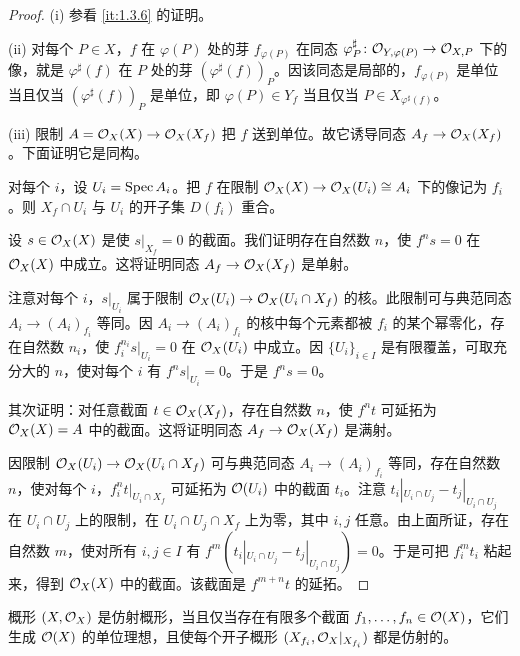\begin{proof}
(i) 参看 \ref{it:1.3.6} 的证明。

(ii) 对每个 $P\in X$，$f$ 在 $\varphi(P)$ 处的芽 $f_{\varphi(P)}$ 在同态 $\varphi^\sharp_P\colon \mathcal{O}_{Y,\varphi(P)}\to \mathcal{O}_{X,P}$ 下的像，就是 $\varphi^\sharp(f)$ 在 $P$ 处的芽 $(\varphi^\sharp(f))_P$。因该同态是局部的，$f_{\varphi(P)}$ 是单位当且仅当 $(\varphi^\sharp(f))_P$ 是单位，即 $\varphi(P)\in Y_f$ 当且仅当 $P\in X_{\varphi^\sharp(f)}$。

(iii) 限制 $A=\mathcal{O}_X(X)\to \mathcal{O}_X(X_f)$ 把 $f$ 送到单位。故它诱导同态 $A_f\to \mathcal{O}_X(X_f)$。下面证明它是同构。

对每个 $i$，设 $U_i=\operatorname{Spec} A_i$。把 $f$ 在限制 $\mathcal{O}_X(X)\to \mathcal{O}_X(U_i)\cong A_i$ 下的像记为 $f_i$。则 $X_f\cap U_i$ 与 $U_i$ 的开子集 $D(f_i)$ 重合。

设 $s\in \mathcal{O}_X(X)$ 是使 $s|_{X_f}=0$ 的截面。我们证明存在自然数 $n$，使 $f^n s=0$ 在 $\mathcal{O}_X(X)$ 中成立。这将证明同态 $A_f\to \mathcal{O}_X(X_f)$ 是单射。

注意对每个 $i$，$s|_{U_i}$ 属于限制 $\mathcal{O}_X(U_i)\to \mathcal{O}_X(U_i\cap X_f)$ 的核。此限制可与典范同态 $A_i\to (A_i)_{f_i}$ 等同。因 $A_i\to (A_i)_{f_i}$ 的核中每个元素都被 $f_i$ 的某个幂零化，存在自然数 $n_i$，使 $f_i^{n_i}s|_{U_i}=0$ 在 $\mathcal{O}_X(U_i)$ 中成立。因 $\{U_i\}_{i\in I}$ 是有限覆盖，可取充分大的 $n$，使对每个 $i$ 有 $f^n s|_{U_i}=0$。于是 $f^n s=0$。

其次证明：对任意截面 $t\in \mathcal{O}_X(X_f)$，存在自然数 $n$，使 $f^n t$ 可延拓为 $\mathcal{O}_X(X)=A$ 中的截面。这将证明同态 $A_f\to \mathcal{O}_X(X_f)$ 是满射。

因限制 $\mathcal{O}_X(U_i)\to \mathcal{O}_X(U_i\cap X_f)$ 可与典范同态 $A_i\to (A_i)_{f_i}$ 等同，存在自然数 $n$，使对每个 $i$，$f_i^n t|_{U_i\cap X_f}$ 可延拓为 $\mathcal{O}(U_i)$ 中的截面 $t_i$。注意 $t_i|_{U_i\cap U_j}-t_j|_{U_i\cap U_j}$ 在 $U_i\cap U_j$ 上的限制，在 $U_i\cap U_j\cap X_f$ 上为零，其中 $i,j$ 任意。由上面所证，存在自然数 $m$，使对所有 $i,j\in I$ 有 $f^m(t_i|_{U_i\cap U_j}-t_j|_{U_i\cap U_j})=0$。于是可把 $f_i^m t_i$ 粘起来，得到 $\mathcal{O}_X(X)$ 中的截面。该截面是 $f^{m+n}t$ 的延拓。
\end{proof}

\begin{proposition}\label{it:1.3.10}
概形 $(X,\mathcal{O}_X)$ 是仿射概形，当且仅当存在有限多个截面 $f_1,\dots,f_n\in \mathcal{O}(X)$，它们生成 $\mathcal{O}(X)$ 的单位理想，且使每个开子概形 $(X_{f_i},\mathcal{O}_X|_{X_{f_i}})$ 都是仿射的。
\end{proposition}

